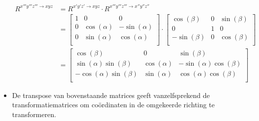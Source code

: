 \begin{itemize}
\begin{equation}
\begin{split}
R^{x'''y'''z''' \rightarrow xyz}&=R^{x'y'z' \rightarrow xyz} \cdot R^{x'''y'''z''' \rightarrow x''y''z''}\\
&=
\begin{bmatrix}
1			&			0			&			0		   \\
0			&\cos(\alpha)&-\sin(\alpha)\\
0			&\sin(\alpha)&\cos(\alpha) \\
\end{bmatrix}
\cdot
\begin{bmatrix}
\cos(\beta)	&			0			&\sin(\beta)\\
0						&			1			&			0		 \\
-\sin(\beta)&			0			&\cos(\beta)\\
\end{bmatrix}\\
&=\begin{bmatrix}
\cos(\beta)							&			0				&\sin(\beta)\\
\sin(\alpha)\sin(\beta)	&\cos(\alpha)	&-\sin(\alpha)\cos(\beta)\\
-\cos(\alpha)\sin(\beta)&\sin(\alpha)	&\cos(\alpha)\cos(\beta)\\
\end{bmatrix}
\end{split}
\label{eq:tm3}
\end{equation}
\item De transpose van bovenstaande matrices geeft vanzelfsprekend de transformatiematrices om coördinaten in de omgekeerde richting te transformeren.
\end{itemize}